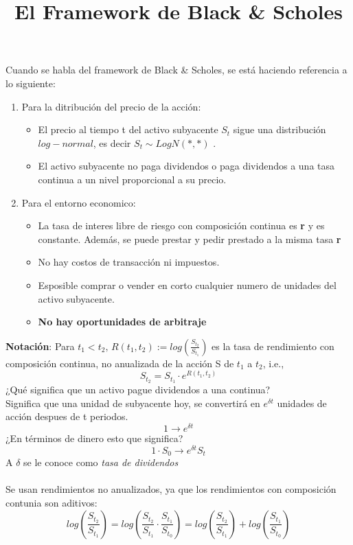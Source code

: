 \documentclass[12pts]{extarticle}
\title{El Framework de Black \& Scholes}
\author{}
\date{}
\begin{document}
\maketitle
Cuando se habla del framework de Black \& Scholes, se está haciendo referencia a lo siguiente: 
\begin{enumerate}
\item Para la ditribución del precio de la acción: 
\begin{itemize}
\item El precio al tiempo t del activo subyacente $S_t$ sigue una distribución $log-normal$, es decir $S_t \sim LogN(*,*)$ .
\item El activo subyacente no paga dividendos o paga dividendos a una tasa continua a un nivel proporcional a su precio. 
\end{itemize} 
\item Para el entorno economico:
\begin{itemize}
\item La tasa de interes libre de riesgo con composición continua es \textbf{r} y es constante. Además, se puede prestar y pedir prestado a la misma tasa \textbf{r} 
\item No hay costos de transacción ni impuestos. 
\item Esposible comprar o vender en corto cualquier numero de unidades del activo subyacente. 
\item \textbf{No hay oportunidades de arbitraje}
\end{itemize} 
\end{enumerate}
\textbf{Notación}: Para $t_1 < t_2,\,  R(t_1, t_2) :=log(\frac{S_{t_{2}}}{S_{t_{1}}})$ es la tasa de rendimiento con composición continua, no anualizada de la acción S de $t_1$ a $t_2$, i.e., $$ S_{t_{2}} = S_{t_{1}}\cdot e^{R(t_1, t_2)}$$
¿Qué significa que un activo pague dividendos a una continua? \\ Significa que una unidad de subyacente hoy, se convertirá en $e^{\delta t}$ unidades de acción despues de t periodos. 
$$ 1 \rightarrow e^{\delta t}$$ 
¿En términos de dinero esto que significa? $$ 1\cdot S_0 \rightarrow e^{\delta t}S_t$$ 
A $\delta$ se le conoce como \textit{tasa de dividendos} \\ \\
Se usan rendimientos no anualizados, ya que los rendimientos con composición contunia son aditivos: 
$$ log(\frac{S_{t_{2}}}{S_{t_{1}}})=log(\frac{S_{t_{2}}}{S_{t_{1}}}\cdot \frac{S_{t_{1}}}{S_{t_{0}}})=log(\frac{S_{t_{2}}}{S_{t_{1}}})+log(\frac{S_{t_{1}}}{S_{t_{0}}})$$
\end{document}
